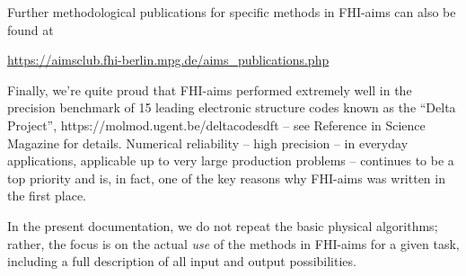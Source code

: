 Further methodological publications for specific methods 
in FHI-aims can also be found at

\url{https://aimsclub.fhi-berlin.mpg.de/aims_publications.php}

Finally, we're quite proud that FHI-aims performed extremely well in the 
precision benchmark of 15 leading electronic structure codes known as
the ``Delta Project'', https://molmod.ugent.be/deltacodesdft -- see 
Reference \cite{Lejaeghereaad3000} in Science Magazine for
details.  
Numerical reliability -- high precision -- in everyday applications,
applicable up to very large production problems -- continues to be a top
priority and is, in fact, one of the key reasons why FHI-aims was
written in the first place. 

In the present documentation, we do not repeat the basic physical
algorithms; rather, the focus is on the actual \emph{use} of the methods in
FHI-aims for a given task, including a full description of all input and
output possibilities.  

